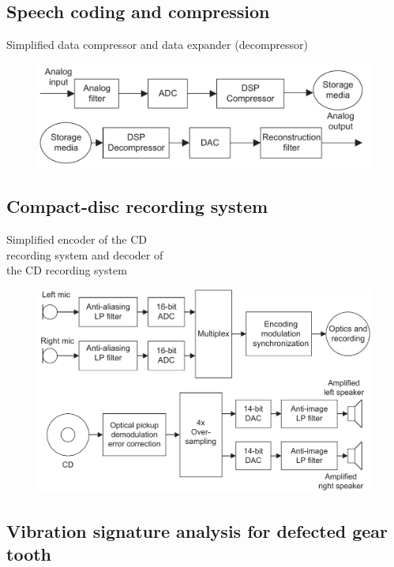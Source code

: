 \documentclass[pdflatex,compress,mathserif]{beamer}
\begin{document}
\subsection{Speech coding and compression}

\begin{frame}{Simplified data compressor and data expander (decompressor)}
	\begin{figure}
		\includegraphics[width=0.8\linewidth]{img/img09}
	\end{figure}
\end{frame}

\subsection{Compact-disc recording system}

\begin{frame}{Simplified encoder of the CD\\recording system and decoder of\\the CD recording system}
	\begin{figure}
		\includegraphics[width=0.7\linewidth]{img/img10}
	\end{figure}
\end{frame}

\subsection{Vibration signature analysis for defected gear tooth}
\end{document}
